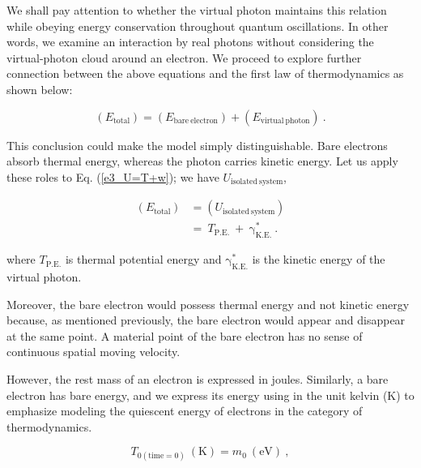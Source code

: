 \documentclass[%
 reprint,
 amsmath,amssymb,
 aps,
]{revtex4-1}
\numberwithin{equation}{section}
\begin{document}
    We shall pay attention to whether the virtual photon maintains this relation while obeying energy conservation throughout quantum oscillations. In other words, we examine an interaction by real photons without considering the virtual-photon cloud around an electron. We proceed to explore further connection between the above equations and the first law of thermodynamics as shown below:

        \begin{equation}
            \left( E_{\mathrm{total}} \right) = \left( E_{\mathrm{bare \ electron}} \right) + \left( E_{\mathrm{virtual \ photon}} \right)
            \ .
            \label{e3_E_total^2_06}
        \end{equation}

    This conclusion could make the model simply distinguishable. Bare electrons absorb thermal energy, whereas the photon carries kinetic energy. Let us apply these roles to Eq. (\ref{e3_U=T+w});  we have $U_{\mathrm{isolated \ system}}$,

        \begin{equation}
            \begin{split}
                \left( E_{\mathrm{total}} \right)
                    &= \left( U_{\mathrm{isolated \ system}} \right) \\
                    &= \ {T_{\mathrm{P.E.}}} \ + \ \mathrm{\gamma}^{*}_\mathrm{K.E.}
                    \ .
            \end{split}
        \end{equation}

    \noindent
    where ${T_{\mathrm{P.E.}}}$ is thermal potential energy and $\mathrm{\gamma}^{*}_\mathrm{K.E.}$ is the kinetic energy of the virtual photon.

    Moreover, the bare electron would possess thermal energy and not kinetic energy because, as mentioned previously, the bare electron would appear and disappear at the same point. A material point of the bare electron has no sense of continuous spatial moving velocity.

    However, the rest mass of an electron is expressed in joules. Similarly, a bare electron has bare energy, and we express its energy using in the unit kelvin (K) to emphasize modeling the quiescent energy of electrons in the category of thermodynamics.

        \begin{equation}
            T_{\mathrm{0(time=0)}} \ (\mathrm{K}) = m_{0} \ (\mathrm{eV})
            \ ,
        \end{equation}
\end{document}
